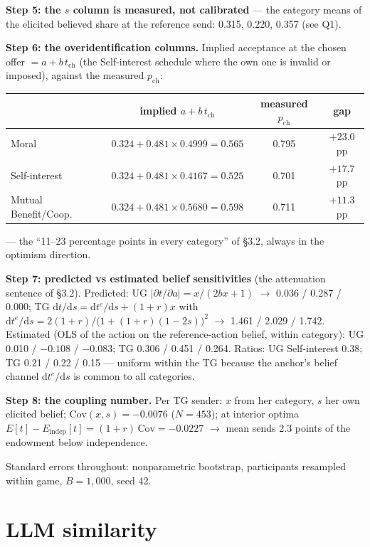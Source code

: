 \documentclass[11pt]{article}
\begin{document}
\textbf{Step 5: the $s$ column is measured, not calibrated} --- the category means of the elicited believed share at the reference send: 0.315, 0.220, 0.357 (see Q1).

\textbf{Step 6: the overidentification columns.} Implied acceptance at the chosen offer $= a + b\,t_{\mathrm{ch}}$ (the Self-interest schedule where the own one is invalid or imposed), against the measured $p_{\mathrm{ch}}$:
\begin{center}
\footnotesize
\begin{tabular}{l ccc}
\toprule
& implied $a + b\,t_{\mathrm{ch}}$ & measured $p_{\mathrm{ch}}$ & gap \\
\midrule
Moral & $0.324 + 0.481 \times 0.4999 = 0.565$ & 0.795 & $+23.0$pp \\
Self-interest & $0.324 + 0.481 \times 0.4167 = 0.525$ & 0.701 & $+17.7$pp \\
Mutual Benefit/Coop. & $0.324 + 0.481 \times 0.5680 = 0.598$ & 0.711 & $+11.3$pp \\
\bottomrule
\end{tabular}
\end{center}
--- the ``11--23 percentage points in every category'' of \S3.2, always in the optimism direction.

\textbf{Step 7: predicted vs estimated belief sensitivities} (the attenuation sentence of \S3.2). Predicted: UG $|\partial t/\partial a| = x/(2bx+1)$ $\to$ 0.036 / 0.287 / 0.000; TG $\mathrm{d}t/\mathrm{d}s = \mathrm{d}t^{e}/\mathrm{d}s + (1+r)x$ with $\mathrm{d}t^{e}/\mathrm{d}s = 2(1+r)/\bigl(1+(1+r)(1-2s)\bigr)^{2}$ $\to$ 1.461 / 2.029 / 1.742. Estimated (OLS of the action on the reference-action belief, within category): UG 0.010 / $-0.108$ / $-0.083$; TG 0.306 / 0.451 / 0.264. Ratios: UG Self-interest 0.38; TG 0.21 / 0.22 / 0.15 --- uniform within the TG because the anchor's belief channel $\mathrm{d}t^{e}/\mathrm{d}s$ is common to all categories.

\textbf{Step 8: the coupling number.} Per TG sender: $x$ from her category, $s$ her own elicited belief; $\mathrm{Cov}(x, s) = -0.0076$ ($N = 453$); at interior optima $E[t] - E_{\mathrm{indep}}[t] = (1+r)\,\mathrm{Cov} = -0.0227$ $\to$ mean sends 2.3 points of the endowment below independence.

Standard errors throughout: nonparametric bootstrap, participants resampled within game, $B = 1{,}000$, seed 42.

\section*{LLM similarity}
\end{document}
